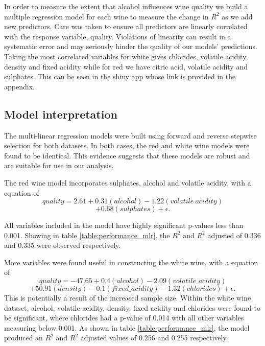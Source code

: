 \documentclass[letterpaper,11pt,twocolumn,twoside,]{pinp}
\begin{document}
\vspace{-6truemm}

In order to measure the extent that alcohol influences wine quality we
build a multiple regression model for each wine to measure the change in
\(R^{2}\) as we add new predictors. Care was taken to ensure all
predictors are linearly correlated with the response variable, quality.
Violations of linearity can result in a systematic error and may
seriously hinder the quality of our models' predictions. Taking the most
correlated variables for white gives chlorides, volatile acidity,
density and fixed acidity while for red we have citric acid, volatile
acidity and sulphates. This can be seen in the shiny app whose link is
provided in the appendix.

\hypertarget{model-interpretation}{%
\subsection{Model interpretation}\label{model-interpretation}}

The multi-linear regression models were built using forward and reverse
stepwise selection for both datasets. In both cases, the red and white
wine models were found to be identical. This evidence suggests that
these models are robust and are suitable for use in our analysis.

The red wine model incorporates sulphates, alcohol and volatile acidity,
with a equation of \[quality=2.61+0.31(alcohol)-1.22(volatile~acidity)\]
\vspace{-8truemm} \[+0.68(sulphates)+\epsilon.\]

All variables included in the model have highly significant p-values
less than 0.001. Showing in table \ref{table:performance_mlr}, the
\(R^{2}\) and \(R^{2}\) adjusted of 0.336 and 0.335 were observed
respectively.

More variables were found useful in constructing the white wine, with a
equation of \[quality= -47.65 + 0.4(alcohol)-2.09(volatile\_acidity)\]
\vspace{-8truemm}
\[+ 50.91(density) -0.1(fixed\_acidity) -1.32(chlorides)+\epsilon.\]
This is potentially a result of the increased sample size. Within the
white wine dataset, alcohol, volatile acidity, density, fixed acidity
and chlorides were found to be significant, where chlorides had a
p-value of 0.014 with all other variables measuring below 0.001. As
shown in table \ref{table:performance_mlr}, the model produced an
\(R^{2}\) and \(R^{2}\) adjusted values of 0.256 and 0.255 respectively.
\end{document}
